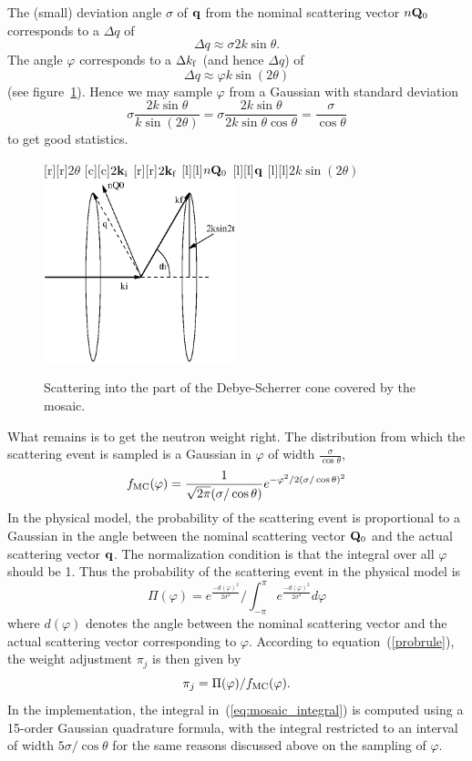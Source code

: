 The (small) deviation angle $\sigma$ of ${\bf q}$ from the nominal
scattering vector $n{\bf Q}_0$ corresponds to a $\Delta q$ of
$$ \Delta q \approx \sigma 2k\sin\theta. $$
The angle $\varphi$ corresponds to a $\Delta k_{\rm f}$ (and hence
$\Delta q$) of
$$ \Delta q \approx \varphi k \sin(2\theta) $$
(see figure~\ref{f:mosaic_cone}).
Hence we may sample $\varphi$ from a Gaussian with standard deviation
$$ \sigma\frac{2k\sin\theta}{k\sin(2\theta)} =
\sigma\frac{2k\sin\theta}{2k\sin\theta\cos\theta} =
\frac{\sigma}{\cos\theta} $$
to get good statistics.
%
\begin{figure}
  \begin{center}
    [r][r]{$2\theta$}
    [c][c]{$2{\bf k}_{\rm i}$}
    [r][r]{$2{\bf k}_{\rm f}$}
    [l][l]{$n{\bf Q}_0$}
    [l][l]{$\bf q$}
    [l][l]{$2 k \sin(2 \theta)$}
    \includegraphics[width=0.5\textwidth]{figures/mosaic_cone.eps}
  \end{center}
\caption{Scattering into the part of the Debye-Scherrer cone covered by
    the mosaic.}
\label{f:mosaic_cone}
\end{figure}

What remains is to get the neutron weight right. The distribution from
which the scattering event is sampled is a Gaussian in $\varphi$ of
width $\frac{\sigma}{\cos\theta}$,
$$ f_{\rm MC}(\varphi) = \frac{1}{\sqrt{2\pi}(\sigma/\cos\theta)}
            e^{-\varphi^2/2(\sigma/\cos\theta)^2}
$$
In the physical model, the probability of the scattering event is
proportional to a Gaussian in the angle between the nominal scattering
vector ${\bf Q}_0$ and the actual scattering vector ${\bf q}$. The
normalization condition is that the integral over all $\varphi$ should
be 1. Thus the probability of the scattering event in the physical model
is
\begin{equation}
  \label{eq:mosaic_integral}
  \Pi(\varphi) = e^{\frac{-d(\varphi)^2}{2\sigma^2}} /
   \int_{-\pi}^{\pi} e^{\frac{-d(\varphi)^2}{2\sigma^2}} d\varphi
\end{equation}
where $d(\varphi)$ denotes the angle between the nominal scattering
vector and the actual scattering vector corresponding to $\varphi$.
According to equation~(\ref{probrule}), the weight adjustment $\pi_j$ is
then given by
$$ \pi_j = \Pi(\varphi) / f_{\rm MC}(\varphi). $$
In the implementation, the integral in~(\ref{eq:mosaic_integral}) is computed
using a 15-order Gaussian quadrature formula, with the integral
restricted to an interval of width $5\sigma/\cos\theta$ for the same
reasons discussed above on the sampling of $\varphi$.

